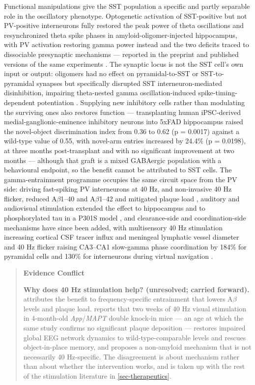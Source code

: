\documentclass[11pt]{article}
\begin{document}
Functional manipulations give the SST population a specific and partly separable role in the oscillatory phenotype. Optogenetic activation of SST-positive but not PV-positive interneurons fully restored the peak power of theta oscillations and resynchronized theta spike phases in amyloid-oligomer-injected hippocampus, with PV activation restoring gamma power instead and the two deficits traced to dissociable presynaptic mechanisms --- reported in the preprint and published versions of the same experiments \citep{Chung2018,Chung2020}. The synaptic locus is not the SST cell's own input or output: oligomers had no effect on pyramidal-to-SST or SST-to-pyramidal synapses but specifically disrupted SST interneuron-mediated disinhibition, impairing theta-nested gamma oscillation-induced spike-timing-dependent potentiation \citep{Park2020}. Supplying new inhibitory cells rather than modulating the surviving ones also restores function --- transplanting human iPSC-derived medial-ganglionic-eminence inhibitory neurons into 5xFAD hippocampus raised the novel-object discrimination index from 0.36 to 0.62 (p = 0.0017) against a wild-type value of 0.55, with novel-arm entries increased by 24.4\% (p = 0.0198), at three months post-transplant and with no significant improvement at two months \citep{Zhang2026a} --- although that graft is a mixed GABAergic population with a behavioural endpoint, so the benefit cannot be attributed to SST cells. The gamma-entrainment programme occupies the same circuit space from the PV side: driving fast-spiking PV interneurons at 40 Hz, and non-invasive 40 Hz flicker, reduced A$\beta$1--40 and A$\beta$1--42 and mitigated plaque load \citep{Iaccarino2016}, auditory and audiovisual stimulation extended the effect to hippocampus and to phosphorylated tau in a P301S model \citep{Martorell2019}, and clearance-side and coordination-side mechanisms have since been added, with multisensory 40 Hz stimulation increasing cortical CSF tracer influx and meningeal lymphatic vessel diameter \citep{Murdock2024} and 40 Hz flicker raising CA3--CA1 slow-gamma phase coordination by 184\% for pyramidal cells and 130\% for interneurons during virtual navigation \citep{Paulson2025}.

\begin{quote}
\noindent\textbf{Evidence Conflict}\par
\textbf{Why does 40 Hz stimulation help? (unresolved; carried forward).} \citet{Iaccarino2016} attributes the benefit to frequency-specific entrainment that lowers A$\beta$ levels and plaque load. \citet{Aguilera2025} reports that two weeks of 40 Hz visual stimulation in 4-month-old \emph{App}/\emph{MAPT} double knock-in mice --- an age at which the same study confirms no significant plaque deposition --- restores impaired global EEG network dynamics to wild-type-comparable levels and rescues object-in-place memory, and proposes a non-amyloid mechanism that is not necessarily 40 Hz-specific. The disagreement is about mechanism rather than about whether the intervention works, and is taken up with the rest of the stimulation literature in \ref{sec-therapeutics}.

\end{quote}
\end{document}
